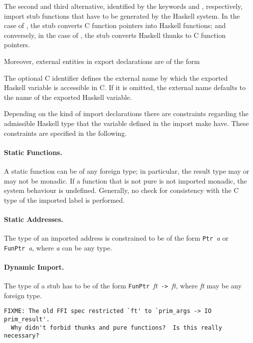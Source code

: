 \documentclass[a4paper,twosides]{article}
\newcommand{\code}[1]{\texttt{#1}}
\begin{document}
The second and third alternative, identified by the keywords 
and , respectively, import stub functions that have to be
generated by the Haskell system.  In the case of , the stub
converts C function pointers into Haskell functions; and conversely, in the
case of , the stub converts Haskell thunks to C function
pointers.

Moreover, external entities in  export declarations are of the
form
%
\begin{grammar}
\end{grammar}
%
The optional C identifier  defines the external name by which the
exported Haskell variable is accessible in C.  If it is omitted, the external
name defaults to the name of the exported Haskell variable.

Depending on the kind of import declarations there are constraints regarding
the admissible Haskell type that the variable defined in the import make
have.  These constraints are specified in the following.

\paragraph{Static Functions.}
A static function can be of any foreign type; in particular, the result type
may or may not be monadic.  If a function that is not pure is not imported
monadic, the system behaviour is undefined.  Generally, no check for
consistency with the C type of the imported label is performed.

\paragraph{Static Addresses.}
The type of an imported address is constrained to be of the form \code{Ptr
  }\textit{a} or \code{FunPtr }\textit{a}, where \textit{a} can be any type.

\paragraph{Dynamic Import.}
The type of a  stub has to be of the form \code{FunPtr
  }\textit{ft}\code{ -> }\textit{ft}, where \textit{ft} may be any foreign
type.
\begin{verbatim}
FIXME: The old FFI spec restricted `ft' to `prim_args -> IO prim_result'.
  Why didn't forbid thunks and pure functions?  Is this really necessary?
\end{verbatim}
\end{document}
